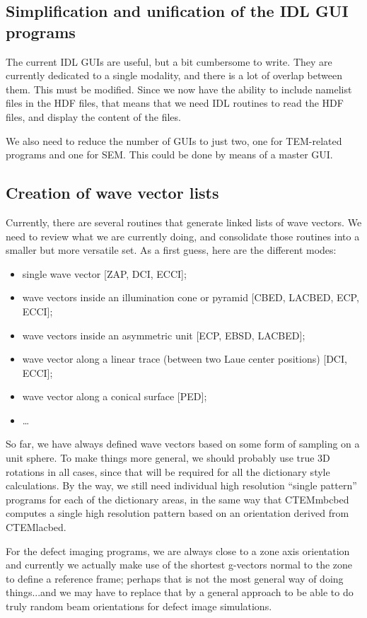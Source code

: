 \documentclass[DIV=calc, paper=letter, fontsize=11pt]{scrartcl}	 %
\begin{document}
\subsection{Simplification and unification of the IDL GUI programs}
The current IDL GUIs are useful, but a bit cumbersome to write.  They are currently dedicated 
to a single modality, and there is a lot of overlap between them.  This must be modified. Since
we now have the ability to include namelist files in the HDF files, that means that we need IDL
routines to read the HDF files, and display the content of the files. 

We also need to reduce the number of GUIs to just two, one for TEM-related programs and 
one for SEM.  This could be done by means of a master GUI.


\subsection{Creation of wave vector lists}
Currently, there are several routines that generate linked lists of wave vectors.  We need to review what we
are currently doing, and consolidate those routines into a smaller but more versatile set.  As a first guess,
here are the different modes:
\begin{itemize}
	\item single wave vector [ZAP, DCI, ECCI];
	\item wave vectors inside an illumination cone or pyramid [CBED, LACBED, ECP, ECCI];
	\item wave vectors inside an asymmetric unit [ECP, EBSD, LACBED];
	\item wave vector along a linear trace (between two Laue center positions) [DCI, ECCI];
	\item wave vector along a conical surface [PED];
	\item \ldots
\end{itemize}

So far, we have always defined wave vectors based on some form of sampling on a unit sphere.  To make things 
more general, we should probably use true 3D rotations in all cases, since that will be required for all the dictionary style
calculations.  By the way, we still need individual high resolution ``single pattern'' programs for each of the dictionary 
areas, in the same way that CTEMmbcbed computes a single high resolution pattern based on an orientation 
derived from CTEMlacbed.

For the defect imaging programs, we are always close to a zone axis orientation and currently we actually 
make use of the shortest g-vectors normal to the zone to define a reference frame; perhaps that is not 
the most general way of doing things...and we may have to replace that by a general approach to be able
to do truly random beam orientations for defect image simulations.
\end{document}
